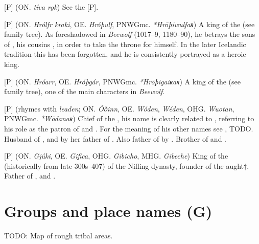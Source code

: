\begin{itemize}
[P] (ON. \emph{tíva rǫk})
  See the [P].

[P] (ON. \emph{Hrólfr kraki}, OE. \emph{Hróþulf}, PNWGmc. \emph{*Hrōþiwulfaʀ})
  A king of the  (see family tree). As foreshadowed in \emph{Beewolf} (1017–9, 1180–90), he betrays the sons of , his cousins , in order to take the throne for himself. In the later Icelandic tradition this has been forgotten, and he is consistently portrayed as a heroic king.

[P] (ON. \emph{Hróarr}, OE. \emph{Hróþgár}, PNWGmc. \emph{*Hrōþigaiʀaʀ})
  A king of the  (see family tree), one of the main characters in \emph{Beewolf}.

[P] (rhymes with \emph{leaden}; ON. \emph{Óðinn}, OE. \emph{Wóden}, \emph{Wéden}, OHG. \emph{Wuotan}, PNWGmc. \emph{*Wōdanaʀ})
  Chief of the , his name is clearly related to , referring to his role as the patron of  and . For the meaning of his other names see ,  TODO. Husband of , and by her father of . Also father of  by . Brother of  and .

[P] (ON. \emph{Gjúki}, OE. \emph{Gifica}, OHG. \emph{Gibicho}, MHG. \emph{Gibeche})
  King of the  (historically from late 300s–407) of the Nifling dynasty, founder of the  aught†. Father of ,  and .

\end{itemize}


\section{Groups and place names (G)}

TODO: Map of rough tribal areas.

